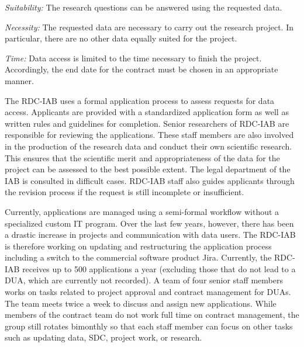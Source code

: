 \emph{Suitability:} The research questions can be answered using the requested data.

\emph{Necessity:} The requested data are necessary to carry out the research project. In particular, there are no other data equally suited for the project.

\emph{Time:} Data access is limited to the time necessary to finish the project. Accordingly, the end date for the contract must be chosen in an appropriate manner.

The RDC-IAB uses a formal application process to assess requests for data access. Applicants are provided with a standardized application form as well as written rules and guidelines for completion. Senior researchers of RDC-IAB are responsible for reviewing the applications. These staff members are also involved in the production of the research data and conduct their own scientific research. This ensures that the scientific merit and appropriateness of the data for the project can be assessed to the best possible extent. The legal department of the IAB is consulted in difficult cases. RDC-IAB staff also guides applicants through the revision process if the request is still incomplete or insufficient.

Currently, applications are managed using a semi-formal workflow without a specialized custom IT program. Over the last few years, however, there has been a drastic increase in projects and communication with data users. The RDC-IAB is therefore working on updating and restructuring the application process including a switch to the commercial software product Jira. Currently, the RDC-IAB receives up to 500 applications a year (excluding those that do not lead to a DUA, which are currently not recorded). A team of four senior staff members works on tasks related to project approval and contract management for DUAs. The team meets twice a week to discuss and assign new applications. While members of the contract team do not work full time on contract management, the group still rotates bimonthly so that each staff member can focus on other tasks such as updating data, SDC, project work, or research.

